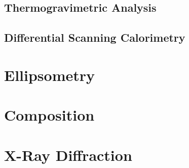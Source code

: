 
\subsection{Thermogravimetric Analysis}



\subsection{Differential Scanning Calorimetry}


\section{Ellipsometry}
\label{chap:Results-Ellipsometry}

\lipsum


\section{Composition}
\label{chap:Results-Composition}

\lipsum



\section{X-Ray Diffraction}
\label{chap:Results-XRD}

\lipsum








